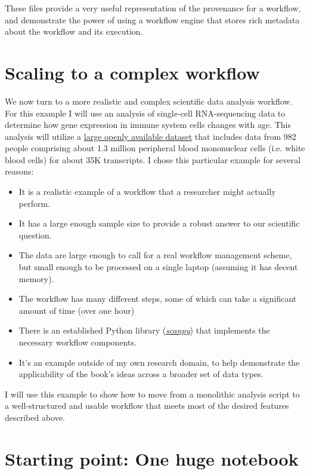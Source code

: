 These files provide a very useful representation of the provenance for a workflow, and demonstrate the power of using a workflow engine that stores rich metadata about the workflow and its execution.

\section{Scaling to a complex workflow}

We now turn to a more realistic and complex scientific data analysis workflow. For this example I will use an analysis of single-cell RNA-sequencing data to determine how gene expression in immune system cells changes with age. This analysis will utilize a \href{https://cellxgene.cziscience.com/collections/dde06e0f-ab3b-46be-96a2-a8082383c4a1}{large openly available dataset} that includes data from 982 people comprising about 1.3 million peripheral blood mononuclear cells (i.e. white blood cells) for about 35K transcripts.  I chose this particular example for several reasons:

\begin{itemize}
\item It is a realistic example of a workflow that a researcher might actually perform.
\item It has a large enough sample size to provide a robust answer to our scientific question.
\item The data are large enough to call for a real workflow management scheme, but small enough to be processed on a single laptop (assuming it has decent memory).
\item The workflow has many different steps, some of which can take a significant amount of time (over one hour)
\item There is an established Python library (\href{https://scanpy.readthedocs.io/en/stable/}{\textit{scanpy}}) that implements the necessary workflow components.
\item It's an example outside of my own research domain, to help demonstrate the applicability of the book's ideas across a broader set of data types.
\end{itemize}

I will use this example to show how to move from a monolithic analysis script to a well-structured and usable workflow that meets most of the desired features described above.

\section{Starting point: One huge notebook}

